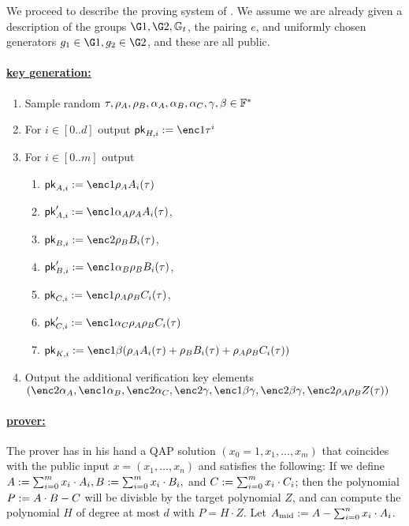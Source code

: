 \documentclass[11pt]{article}
\numberwithin{figure}{section} %
\begin{document}
We proceed to describe the proving system of \cite{BCTV}.
We assume we are already given a description of the groups $\G1,\G2,\Gt$, the pairing $e$, and uniformly chosen generators 
$g_1\in \G1,g_2\in \G2$, and these are all public.
\paragraph{\underline{\bctv key generation:}}

\begin{enumerate}
 \item Sample random $\tau,\rho_A,\rho_B,\alpha_A,\alpha_B,\alpha_C,\gamma,\beta\in \mathbb F^*$
 \item For $i\in [0..d]$ output $\pk_{H,i}\defeq \enc1{\tau^i}$
 \item For $i\in [0..m]$ output
 
 \begin{enumerate}
  \item $\pk_{A,i}\defeq \enc1{\rho_A A_i(\tau)}$
  
\item  $\pk'_{A,i}\defeq\enc1{\alpha_A\rho_A A_i(\tau)}$,
\item $\pk_{B,i}\defeq\enc2{\rho_B B_i(\tau)}$,
\item $\pk'_{B,i}\defeq \enc1{\alpha_B\rho_B B_i(\tau)}$,
\item $\pk_{C,i}\defeq \enc1{\rho_A\rho_B C_i(\tau)}$,
\item $\pk'_{C,i}\defeq \enc1{\alpha_C \rho_A\rho_B C_i(\tau)}$ 
\item $\pk_{K,i}\defeq \enc1{\beta (\rho_A A_i(\tau) + \rho_B B_i(\tau) + \rho_A\rho_B C_i(\tau))}$ 

\end{enumerate}
\item Output the additional verification key elements $(\enc2{\alpha_A},\enc1{\alpha_B},\enc2{\alpha_C},\enc2{\gamma},\enc1{\beta\gamma},\enc2{\beta\gamma},\enc2{\rho_A\rho_B Z(\tau)})$
 \end{enumerate}

\newcommand{\Amid}{\ensuremath{A_{\mathrm{mid}}}\xspace}
\paragraph{\underline{\bctv prover:}\\}
The prover \per has in his hand a QAP solution $(x_0=1,x_1,\ldots,x_m)$ that coincides with the public input $x=(x_1,\ldots,x_n)$ and satisfies the following:
If we define $A:= \sum_{i=0}^m x_i\cdot A_i, B:= \sum_{i=0}^m x_i \cdot B_i,$ and $C:= \sum_{i=0}^m x_i \cdot C_i$;
then the polynomial $P:= A\cdot B - C$ will be divisble by the target polynomial $Z$, and \per can compute the polynomial $H$ of degree at most $d$ with $P=H\cdot Z$. Let $\Amid\defeq A -\sum_{i=0}^n x_i\cdot A_i$.
\end{document}
